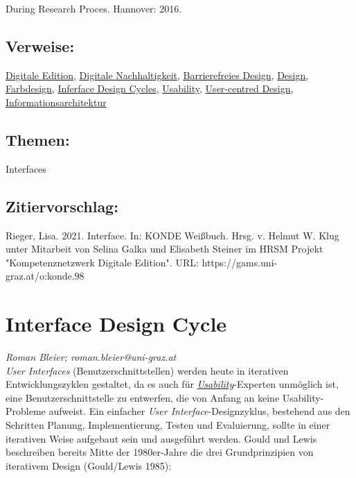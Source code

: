 \documentclass{article}
\begin{document}
\begin{itemize}
                              During Research Proces. Hannover: 2016.\end{itemize}\subsection*{Verweise:}\href{https://gams.uni-graz.at/o:konde.59}{Digitale Edition}, \href{https://gams.uni-graz.at/o:konde.6}{Digitale Nachhaltigkeit}, \href{https://gams.uni-graz.at/o:konde.35}{Barrierefreies Design}, \href{https://gams.uni-graz.at/o:konde.56}{Design}, \href{https://gams.uni-graz.at/o:konde.84}{Farbdesign}, \href{https://gams.uni-graz.at/o:konde.99}{Inferface Design Cycles}, \href{https://gams.uni-graz.at/o:konde.205}{Usability}, \href{https://gams.uni-graz.at/o:konde.207}{User-centred Design}, \href{https://gams.uni-graz.at/o:konde.97}{Informationsarchitektur}\subsection*{Themen:}Interfaces\subsection*{Zitiervorschlag:}Rieger, Lisa. 2021. Interface. In: KONDE Weißbuch. Hrsg. v. Helmut W. Klug unter Mitarbeit von Selina Galka und Elisabeth Steiner im HRSM Projekt "Kompetenznetzwerk Digitale Edition". URL: https://gams.uni-graz.at/o:konde.98\newpage\section*{Interface Design Cycle} \emph{Roman Bleier; roman.bleier@uni-graz.at }\\
        
    \emph{User Interfaces} (Benutzerschnittstellen) werden heute in
                  iterativen Entwicklungszyklen gestaltet, da es auch für \emph{\href{http://gams.uni-graz.at/o:konde.205}{Usability}}-Experten unmöglich ist, eine Benutzerschnittstelle zu entwerfen, die von
                  Anfang an keine Usability-Probleme aufweist. Ein einfacher \emph{User
                     Interface}-Designzyklus, bestehend aus den Schritten Planung,
                  Implementierung, Testen und Evaluierung, sollte in einer iterativen Weise
                  aufgebaut sein und ausgeführt werden. Gould und Lewis beschreiben bereits Mitte
                  der 1980er-Jahre die drei Grundprinzipien von iterativem Design (Gould/Lewis
                     1985): \\
            
\end{document}
